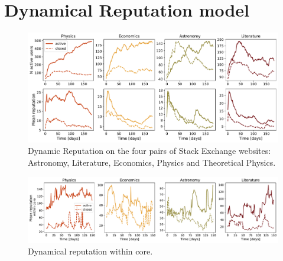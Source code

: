 \section{Dynamical Reputation model}

\begin{figure}[h]
	\centering
	\includegraphics[width=\linewidth]{figures/stackexchange/reputation.pdf}
	\caption{Dynamic Reputation on the four pairs of Stack Exchange websites: Astronomy, Literature, Economics,  Physics and Theoretical Physics.}
	\label{fig:dr6panel}
\end{figure}

\begin{figure}[h]
	\centering
	\includegraphics[width=\linewidth]{figures/stackexchange/core_reputation.pdf}
	\caption{Dynamical reputation within core.}
	\label{fig:dr_core}
\end{figure}


